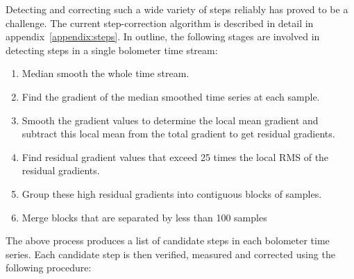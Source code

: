 \documentclass[useAMS,usenatbib,nofootinbib]{mn2e}
\begin{document}
Detecting and correcting such a wide variety of steps reliably has proved
to be a challenge. The current step-correction algorithm is described in
detail in appendix~\ref{appendix:steps}. In outline, the following stages
are involved in detecting steps in a single bolometer time stream:

\begin{enumerate}
\item Median smooth the whole time stream.
\item Find the gradient of the median smoothed time series at each sample.
\item Smooth the gradient values to determine the local mean gradient and
subtract this local mean from the total gradient to get residual gradients.
\item Find residual gradient values that exceed 25 times the local RMS of
the residual gradients.
\item Group these high residual gradients into contiguous blocks of
samples.
\item Merge blocks that are separated by less than 100 samples
\end{enumerate}

The above process produces a list of candidate steps in each bolometer
time series. Each candidate step is then verified, measured and corrected
using the following procedure:
\end{document}
